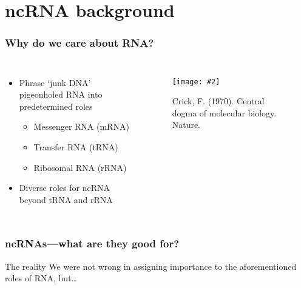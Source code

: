 \documentclass{beamer}
\newcommand{\slidefigure}[2][1]{\centering\texttt{[image: \#2]}}
\begin{document}
\section{ncRNA background}

\begin{frame}
	\frametitle{Why do we care about RNA?}
	\begin{columns}
		\begin{itemize}
			\item<1-> Phrase `junk DNA' pigeonholed RNA into predetermined roles
			\begin{itemize}
				\item<2-> Messenger RNA (mRNA)
				\item<2-> Transfer RNA (tRNA)
				\item<2-> Ribosomal RNA (rRNA)
			\end{itemize}
			\item<3-> Diverse roles for ncRNA beyond tRNA and rRNA
		\end{itemize}

		\begin{figure}
			\slidefigure{crick1970} \caption{Crick, F. (1970). Central dogma of molecular biology. Nature.}
		\end{figure}
	\end{columns}
\end{frame}

\begin{frame}
	\frametitle{ncRNAs---what are they good for?}
	\begin{block}
		{The reality} We were not wrong in assigning importance to the aforementioned roles of RNA, but\dots
	\end{block}
\end{frame}
\end{document}
